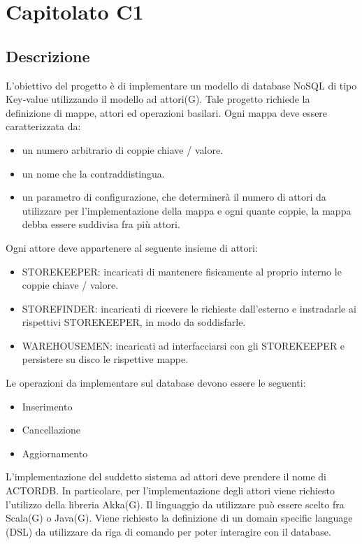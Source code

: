 \section{Capitolato C1}
\subsection{Descrizione}
L'obiettivo del progetto è di implementare un modello di database NoSQL di tipo Key‐value utilizzando il modello ad attori(G).
Tale progetto richiede la definizione di mappe, attori ed operazioni basilari. 
Ogni mappa deve essere caratterizzata da:
\begin{itemize}
\item
un numero arbitrario di coppie chiave / valore. 
\item 
un nome che la contraddistingua. 
\item
un parametro di configurazione, che determinerà il numero di attori da utilizzare per l'implementazione della mappa e ogni quante coppie, la mappa debba essere suddivisa fra più attori.
\end{itemize}
Ogni attore deve appartenere al seguente insieme di attori:
\begin{itemize}
\item
STOREKEEPER: incaricati di mantenere fisicamente al proprio interno le coppie chiave / valore.
\item
STOREFINDER: incaricati di ricevere le richieste dall’esterno e instradarle ai 
rispettivi STOREKEEPER, in modo da soddisfarle. 
\item
WAREHOUSEMEN: incaricati ad interfacciarsi con gli STOREKEEPER e persistere su disco le rispettive mappe.
\end{itemize}

Le operazioni da implementare sul database devono essere le seguenti: 
\begin{itemize}
\item
Inserimento
\item
Cancellazione 
\item
Aggiornamento 
\end{itemize}

L'implementazione del suddetto sistema ad attori deve prendere il nome di ACTORDB. In particolare, per l'implementazione degli attori viene richiesto l'utilizzo della libreria Akka(G).
Il linguaggio da utilizzare può essere scelto fra Scala(G) o Java(G). 
Viene richiesto la definizione di un domain specific language (DSL) da utilizzare da riga di comando per poter interagire con il database.

